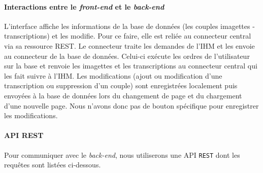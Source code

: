 \paragraph{Interactions entre le \textit{front-end} et le \textit{back-end}}

L’interface affiche les informations de la base de données (les couples imagettes - transcriptions) et les modifie. Pour ce faire, elle est reliée au connecteur central via sa ressource REST. Le connecteur traite les demandes de l’IHM et les envoie au connecteur de la base de données. Celui-ci exécute les ordres de l’utilisateur sur la base et renvoie les imagettes et les transcriptions au connecteur central qui les fait suivre à l’IHM. Les modifications (ajout ou modification d’une transcription ou suppression d’un couple) sont enregistrées localement puis envoyées à la base de données lors du changement de page et du chargement d'une nouvelle page. Nous n'avons donc pas de bouton spécifique pour enregistrer les modifications.

\newpage{}

\paragraph{API REST}
Pour communiquer avec le \textit{back-end}, nous utiliserons une API \texttt{REST} dont les requêtes sont listées ci-dessous.
\newline{}

